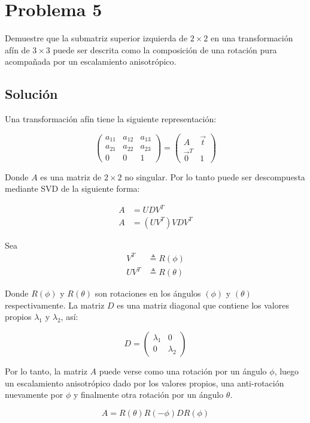 \section*{Problema 5}
\setcounter{equation}{0}
Demuestre que la submatriz superior izquierda de $2 \times 2$ en una transformación afín de 
$3 \times 3$ puede ser descrita como la composición de una rotación pura acompañada por un 
escalamiento anisotrópico.

\subsection*{Solución}

Una transformación afín tiene la siguiente representación:

\begin{equation*}
\begin{pmatrix}
a_{11} & a_{12} & a_{13} \\ 
a_{21} & a_{22} & a_{23} \\ 
0 & 0 & 1
\end{pmatrix} 
= 
\begin{pmatrix}
A & \vec{t} \\ 
\vec{0}^T & 1
\end{pmatrix} 
\end{equation*} 

Donde $A$ es una matriz de $2 \times 2$ no singular. Por lo tanto puede ser descompuesta
mediante SVD de la siguiente forma:

\begin{align*}
A &= U D V^T \\
A &= (U V^T) V D V^T
\end{align*} 

Sea
\begin{align*}
V^T &\triangleq R(\phi) \\
U V^T &\triangleq R(\theta)
\end{align*} 

Donde $R(\phi)$ y $R(\theta)$ son rotaciones en los ángulos $(\phi)$ y $(\theta)$ respectivamente.
La matriz $D$ es una matriz diagonal que contiene los valores propios 
$\lambda_1$ y $\lambda_2$, así:

\begin{equation*}
D = \begin{pmatrix}
\lambda_1 & 0 \\ 
0 &\lambda_2
\end{pmatrix} 
\end{equation*} 

Por lo tanto, la matriz $A$ puede verse como una rotación por un ángulo $\phi$, luego un 
escalamiento anisotrópico dado por los valores propios, una anti-rotación nuevamente
por $\phi$ y finalmente otra rotación por un ángulo $\theta$.


\begin{equation}
A = R(\theta) R(-\phi) D R(\phi)
\label{eq:}
\end{equation} 

